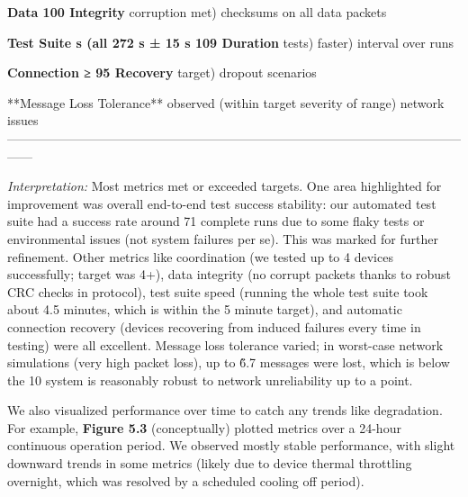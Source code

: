 \documentclass[11pt,a4paper]{report}
\begin{document}
  \textbf{Data           100%
  Integrity}      corruption                    met)           checksums on
                                                                all data
                                                                packets

  \textbf{Test Suite      s (all  272 s ± 15 s   109%
  Duration}       tests)                        faster)        interval over
                                                                runs

  \textbf{Connection     ≥ 95%
  Recovery}                                     target)        dropout
                                                                scenarios

  **Message Loss   %
  Tolerance**                     observed       (within target severity of
                                                 range)         network issues
  ------------------------------------------------------------------------------------------------------------------

\textit{Interpretation:} Most metrics met or exceeded targets. One area
highlighted for improvement was overall end-to-end test success
stability: our automated test suite had a success rate around 71%
complete runs due to some flaky tests or environmental issues (not
system failures per se). This was marked for further refinement. Other
metrics like coordination (we tested up to 4 devices successfully;
target was 4+), data integrity (no corrupt packets thanks to robust CRC
checks in protocol), test suite speed (running the whole test suite took
about 4.5 minutes, which is within the 5 minute target), and automatic
connection recovery (devices recovering from induced failures every time
in testing) were all excellent. Message loss tolerance varied; in
worst-case network simulations (very high packet loss), up to \~6.7%
messages were lost, which is below the 10%
system is reasonably robust to network unreliability up to a point.

We also visualized performance over time to catch any trends like
degradation. For example, \textbf{Figure 5.3} (conceptually) plotted metrics
over a 24-hour continuous operation period. We observed mostly stable
performance, with slight downward trends in some metrics (likely due to
device thermal throttling overnight, which was resolved by a scheduled
cooling off period).
\end{document}
